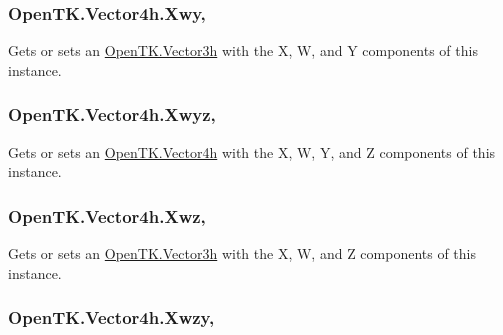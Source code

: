 \hypertarget{struct_open_t_k_1_1_vector4h_a8682bb52aff40a71f1178ce757eae07d}{
\subsubsection[{Xwy}]{ Open\-T\-K.\-Vector4h.\-Xwy\hspace{0.3cm}{\ttfamily [get]}, {\ttfamily [set]}}}\label{struct_open_t_k_1_1_vector4h_a8682bb52aff40a71f1178ce757eae07d}


Gets or sets an \hyperlink{struct_open_t_k_1_1_vector3h}{Open\-T\-K.\-Vector3h} with the X, W, and Y components of this instance. 

\hypertarget{struct_open_t_k_1_1_vector4h_ab325e2a2b8f2cf1e1f7832aaf9afe842}{
\subsubsection[{Xwyz}]{ Open\-T\-K.\-Vector4h.\-Xwyz\hspace{0.3cm}{\ttfamily [get]}, {\ttfamily [set]}}}\label{struct_open_t_k_1_1_vector4h_ab325e2a2b8f2cf1e1f7832aaf9afe842}


Gets or sets an \hyperlink{struct_open_t_k_1_1_vector4h}{Open\-T\-K.\-Vector4h} with the X, W, Y, and Z components of this instance. 

\hypertarget{struct_open_t_k_1_1_vector4h_a19a56a623828a8d44cd9ac19f9178c77}{
\subsubsection[{Xwz}]{ Open\-T\-K.\-Vector4h.\-Xwz\hspace{0.3cm}{\ttfamily [get]}, {\ttfamily [set]}}}\label{struct_open_t_k_1_1_vector4h_a19a56a623828a8d44cd9ac19f9178c77}


Gets or sets an \hyperlink{struct_open_t_k_1_1_vector3h}{Open\-T\-K.\-Vector3h} with the X, W, and Z components of this instance. 

\hypertarget{struct_open_t_k_1_1_vector4h_acffa73fb0adabc9c6c60f418edd225f1}{
\subsubsection[{Xwzy}]{ Open\-T\-K.\-Vector4h.\-Xwzy\hspace{0.3cm}{\ttfamily [get]}, {\ttfamily [set]}}}\label{struct_open_t_k_1_1_vector4h_acffa73fb0adabc9c6c60f418edd225f1}


